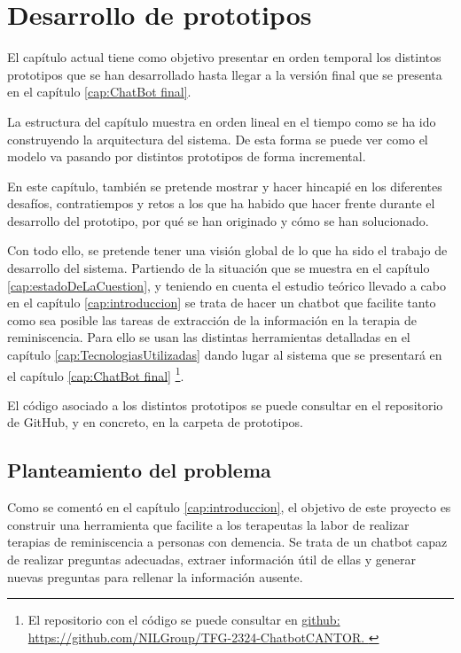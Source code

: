 \chapter{Desarrollo de prototipos}
\label{cap:Desarrollo de prototipos}

El capítulo actual tiene como objetivo presentar en orden temporal los distintos prototipos que se han desarrollado hasta llegar a la versión final que se presenta en el capítulo \ref{cap:ChatBot final}. 

La estructura del capítulo  muestra en orden lineal en el tiempo como se ha ido construyendo la arquitectura del sistema. De esta forma se puede ver como el modelo va pasando por distintos prototipos de forma incremental. 

En este capítulo, también se pretende mostrar y hacer hincapié en los diferentes desafíos, contratiempos y retos a los que ha habido que hacer frente durante el desarrollo del prototipo, por qué se han originado y cómo se han solucionado. 

Con todo ello, se pretende tener una visión global de lo que ha sido el trabajo de desarrollo del sistema. Partiendo de la situación que se muestra en el capítulo \ref{cap:estadoDeLaCuestion}, y teniendo en cuenta el estudio teórico llevado a cabo en el capítulo \ref{cap:introduccion} se trata de hacer un chatbot que facilite tanto como sea posible las tareas de extracción de la información en la terapia de reminiscencia. Para ello se usan las distintas herramientas detalladas en el capítulo \ref{cap:TecnologiasUtilizadas} dando lugar al sistema que se presentará en el capítulo \ref{cap:ChatBot final} \footnote{El repositorio con el código se puede consultar en \href{ GitHub}{github:\\
		https://github.com/NILGroup/TFG-2324-ChatbotCANTOR. }}. 


El código asociado a los distintos prototipos se puede consultar en el repositorio de GitHub, y en concreto, en la carpeta de prototipos. 

\section{Planteamiento del problema}
Como se comentó en el capítulo \ref{cap:introduccion}, el objetivo de este proyecto es construir una herramienta que facilite a los terapeutas la labor de realizar terapias de reminiscencia a personas con demencia. Se trata de un chatbot capaz de realizar preguntas adecuadas, extraer información útil de ellas y generar nuevas preguntas para rellenar la información ausente. 

